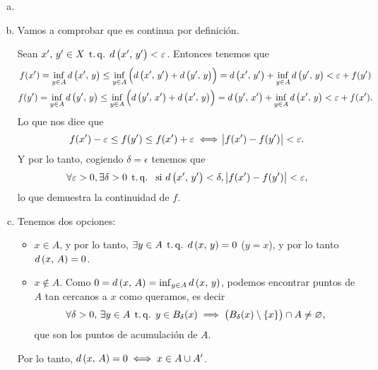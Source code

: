 \begin{eje}
  \begin{enumerate}[(a)]
        \item[]
        \item
            Vamos a comprobar que es continua por definición. 
            
            Sean $x',\,y' \in X \operatorname{\;t.q.\;} d\left( x',\,y'\right) < \varepsilon$. Entonces tenemos que
            \begin{gather*}
             f(x')= \inf_{y\in A} d\left( x',\,y\right) \leq \inf_{y\in A} \left( d\left( x',\,y'\right) + d\left( y',\,y\right) \right) = d\left( x',\,y'\right) + \inf_{y\in A} d\left( y',\,y\right) < \varepsilon + f(y') \\
             f(y')= \inf_{y\in A} d\left( y',\,y\right) \leq \inf_{y\in A} \left( d\left( y',\,x'\right) + d\left( x',\,y\right) \right) = d\left( y',\,x'\right) + \inf_{y\in A} d\left( x',\,y\right) < \varepsilon + f(x').
            \end{gather*}
            Lo que nos dice que 
            \[
             f(x')-\varepsilon \leq f(y') \leq f(x') + \varepsilon \iff \abs{f(x')-f(y')}< \varepsilon .
            \]
            Y por lo tanto, cogiendo $\delta = \epsilon$ tenemos que 
            \[
             \forall \varepsilon > 0, \exists \delta > 0 \operatorname{\;t.q.\;}  \text{ si }d\left( x',\,y'\right) < \delta,\, \abs{f(x')-f(y')} < \varepsilon,
            \]
	    lo que demuestra la continuidad de $f$.
	\item
	  Tenemos dos opciones:
	  \begin{itemize}
	    \item $x \in A$, y por lo tanto, $\exists y \in A \operatorname{\;t.q.\;} d\left( x,\, y\right) = 0$ ($y=x$), y por lo tanto $d\left( x,\,A\right) =0$.
	    \item $x \not\in A$. Como $0=d\left( x,\, A\right) = \inf_{y \in A} d\left( x,\, y\right)$, podemos encontrar puntos de $A$ tan cercanos a $x$ como queramos, es decir
	    \[
	     \forall \delta >0 ,\,  \exists y \in A \operatorname{\;t.q.\;} y \in B_{\delta}(x) \implies \left( B_{\delta}(x)\setminus \{x\}\right) \cap A \neq \varnothing , 
	    \]
	    que son los puntos de acumulación de $A$.
	  \end{itemize}
	  Por lo tanto, $d\left( x,\,A\right) =0 \iff x \in A\cup A'$.
  \end{enumerate}
\end{eje}

